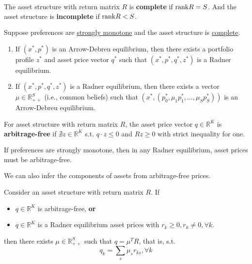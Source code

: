\documentclass[11pt]{elegantbook}
\begin{document}
\begin{definition}
    \normalfont
    The asset structure with return matrix $R$ is \textbf{complete} if $\textnormal{rank}R=S$. And the asset structure is \textbf{incomplete} if $\textnormal{rank}R<S$.
\end{definition}

\begin{theorem}
    Suppose preferences are \underline{strongly monotone} and the asset structure is \underline{complete}.
    \begin{enumerate}
        \item If $(x^*,p^*)$ is an Arrow-Debreu equilibrium, then there exists a portfolio profile $z^*$ and asset price vector $q^*$ such that $(x^*,p^*,q^*,z^*)$ is a Radner equilibrium.
        \item If $(x^*,p^*,q^*,z^*)$ is a Radner equilibrium, then there exists a vector $\mu\in \mathbb{R}_{++}^S$ (i.e., common beliefs) such that $(x^*,(p_0^*,\mu_1p_1^*,...,\mu_Sp_S^*))$ is an Arrow-Debreu equilibrium.
    \end{enumerate}
\end{theorem}



\begin{definition}
\normalfont
    For asset structure with return matrix $R$, the asset price vector $q\in \mathbb{R}^K$ is \textbf{arbitrage-free} if $\nexists z\in \mathbb{R}^K$ s.t. $q\cdot z\leq 0$ and $R z\geq 0$ with strict inequality for one.
\end{definition}

\begin{proposition}
    If preferences are strongly monotone, then in any Radner equilibrium, asset prices must be arbitrage-free.
\end{proposition}

We can also infer the components of assets from arbitrage-free prices.
\begin{theorem}
    Consider an asset structure with return matrix $R$. If
    \begin{itemize}
        \item $q\in\mathbb{R}^K$ is arbitrage-free, \textbf{or}
        \item $q\in\mathbb{R}^K$ is a Radner equilibrium asset prices with $r_k\geq 0, r_k\neq 0, \forall k$.
    \end{itemize}
    then there exists $\mu\in \mathbb{R}_{++}^S$ such that $q=\mu^T R$, that is, s.t. $$q_k=\sum_s \mu_s r_{ks}, \forall k$$
\end{theorem}
\end{document}

